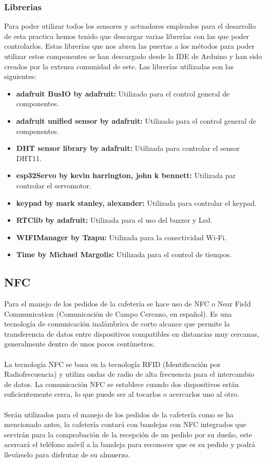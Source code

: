 \documentclass[12pt]{report}
\begin{document}
\subsubsection{Librerias}
Para poder utilizar todos los sensores y actuadores empleados para el desarrollo de esta practica hemos tenido que descargar varias librerías con las que poder controlarlos. Estas librerías que nos abren las puertas a los métodos para poder utilizar estos componentes se han descargado desde la IDE de Arduino y han sido creados por la extensa comunidad de este. Las librerías utilizadas son las siguientes:
\begin{itemize}
    \item \textbf{adafruit BusIO by adafruit:} Utilizado para el control general de componentes.
    \item \textbf{adafruit unified sensor by adafruit:} Utilizado para el control general de componentes.
    \item \textbf{DHT sensor library by adafruit:} Utilizada para controlar el sensor DHT11.
    \item \textbf{esp32Servo by kevin harrington, john k bennett:} Utilizada par controlar el servomotor.
    \item \textbf{keypad by mark stanley, alexander:} Utilizada para controlar el keypad.
    \item \textbf{RTClib by adafruit:} Utilizada para el uso del buzzer y Led.
    \item \textbf{WIFIManager by Tzapu:} Utilizada para la conectividad Wi-Fi.
    \item \textbf{Time by Michael Margolis:} Utilizada para el control de tiempos.
\end{itemize}
\subsection{NFC}
Para el manejo de los pedidos de la cafetería se hace uso de NFC o Near Field Communication (Comunicación de Campo Cercano, en español). Es una tecnología de comunicación inalámbrica de corto alcance que permite la transferencia de datos entre dispositivos compatibles en distancias muy cercanas, generalmente dentro de unos pocos centímetros.
\\\\
La tecnología NFC se basa en la tecnología RFID (Identificación por Radiofrecuencia) y utiliza ondas de radio de alta frecuencia para el intercambio de datos. La comunicación NFC se establece cuando dos dispositivos están suficientemente cerca, lo que puede ser al tocarlos o acercarlos uno al otro.
\\\\
Serán utilizados para el manejo de los pedidos de la cafetería como se ha mencionado antes, la cafetería contará con bandejas con NFC integrados que servirán para la comprobación de la recepción de un pedido por su dueño, este acercará el teléfono móvil a la bandeja para reconocer que es su pedido y podrá llevárselo para disfrutar de su almuerzo.
\end{document}
